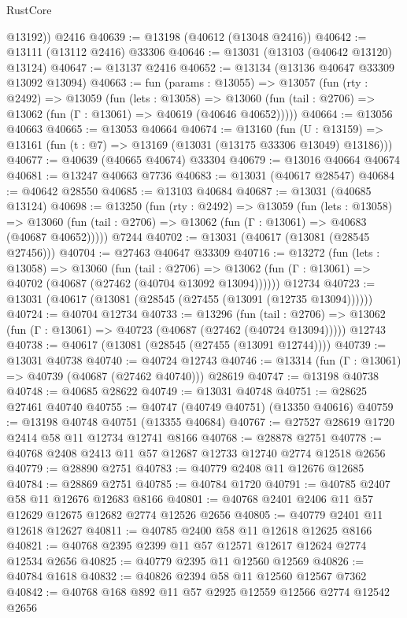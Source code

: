 \begin{lexlean}{RustCore}
\begin{coremodule}
        @13192))
    @2416
@40639 := @13198 (@40612 (@13048 @2416))
@40642 := @13111 (@13112 @2416) @33306
@40646 := @13031 (@13103 (@40642 @13120) @13124)
@40647 := @13137 @2416
@40652 := @13134 (@13136 @40647 @33309 @13092 @13094)
@40663 := fun (params : @13055) =>
  @13057
    (fun (rty : @2492) =>
    @13059
      (fun (lets : @13058) =>
      @13060 (fun (tail : @2706) => @13062 (fun (Γ : @13061) => @40619 (@40646 @40652)))))
@40664 := @13056 @40663
@40665 := @13053 @40664
@40674 := @13160
    (fun (U : @13159) => @13161 (fun (t : @7) => @13169 (@13031 (@13175 @33306 @13049) @13186)))
@40677 := @40639 (@40665 @40674) @33304
@40679 := @13016 @40664 @40674
@40681 := @13247 @40663 @7736
@40683 := @13031 (@40617 @28547)
@40684 := @40642 @28550
@40685 := @13103 @40684
@40687 := @13031 (@40685 @13124)
@40698 := @13250
    (fun (rty : @2492) =>
    @13059
      (fun (lets : @13058) =>
      @13060 (fun (tail : @2706) => @13062 (fun (Γ : @13061) => @40683 (@40687 @40652)))))
    @7244
@40702 := @13031 (@40617 (@13081 (@28545 @27456)))
@40704 := @27463 @40647 @33309
@40716 := @13272
    (fun (lets : @13058) =>
    @13060
      (fun (tail : @2706) =>
      @13062 (fun (Γ : @13061) => @40702 (@40687 (@27462 (@40704 @13092 @13094))))))
    @12734
@40723 := @13031 (@40617 (@13081 (@28545 (@27455 (@13091 (@12735 @13094))))))
@40724 := @40704 @12734
@40733 := @13296
    (fun (tail : @2706) => @13062 (fun (Γ : @13061) => @40723 (@40687 (@27462 (@40724 @13094)))))
    @12743
@40738 := @40617 (@13081 (@28545 (@27455 (@13091 @12744))))
@40739 := @13031 @40738
@40740 := @40724 @12743
@40746 := @13314 (fun (Γ : @13061) => @40739 (@40687 (@27462 @40740))) @28619
@40747 := @13198 @40738
@40748 := @40685 @28622
@40749 := @13031 @40748
@40751 := @28625 @27461 @40740
@40755 := @40747 (@40749 @40751) (@13350 @40616)
@40759 := @13198 @40748 @40751 (@13355 @40684)
@40767 := @27527 @28619 @1720 @2414 @58 @11 @12734 @12741 @8166
@40768 := @28878 @2751
@40778 := @40768 @2408 @2413 @11 @57 @12687 @12733 @12740 @2774 @12518 @2656
@40779 := @28890 @2751
@40783 := @40779 @2408 @11 @12676 @12685
@40784 := @28869 @2751
@40785 := @40784 @1720
@40791 := @40785 @2407 @58 @11 @12676 @12683 @8166
@40801 := @40768 @2401 @2406 @11 @57 @12629 @12675 @12682 @2774 @12526 @2656
@40805 := @40779 @2401 @11 @12618 @12627
@40811 := @40785 @2400 @58 @11 @12618 @12625 @8166
@40821 := @40768 @2395 @2399 @11 @57 @12571 @12617 @12624 @2774 @12534 @2656
@40825 := @40779 @2395 @11 @12560 @12569
@40826 := @40784 @1618
@40832 := @40826 @2394 @58 @11 @12560 @12567 @7362
@40842 := @40768 @168 @892 @11 @57 @2925 @12559 @12566 @2774 @12542 @2656

\end{coremodule}
\end{lexlean}
